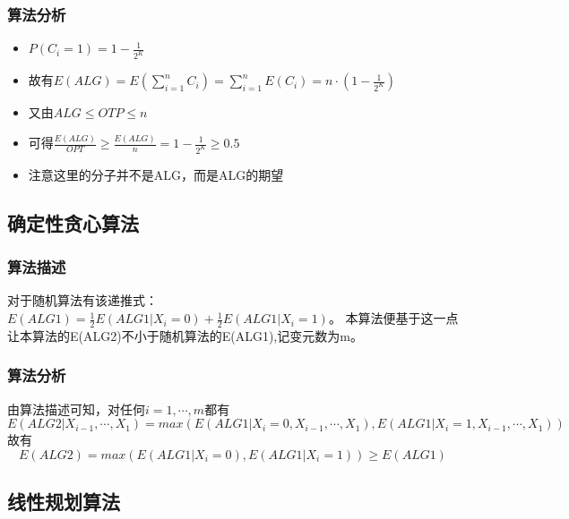 \subsubsection{算法分析}
\begin{itemize}
	\item $P(C_i=1)=1-\frac{1}{2^K} $
	\item 故有$E(ALG)=E(\sum\limits_{i=1}^n C_i)=\sum\limits_{i=1}^n E(C_i)=n\cdot (1-\frac{1}{2^K})$
	\item 又由$ALG\leqslant OTP\leqslant n$
	\item 可得$\frac{E(ALG)}{OPT}\geqslant \frac{E(ALG)}{n}=1-\frac{1}{2^K}\geqslant 0.5$
	\item 注意这里的分子并不是ALG，而是ALG的期望
\end{itemize}

\subsection{确定性贪心算法}

\subsubsection{算法描述}

对于随机算法有该递推式：$E(ALG1)=\frac{1}{2}E(ALG1|X_i=0)+\frac{1}{2}E(ALG1|X_i=1)$。
本算法便基于这一点让本算法的E(ALG2)不小于随机算法的E(ALG1),记变元数为m。

\begin{algorithm}
\end{algorithm}

\subsubsection{算法分析}
由算法描述可知，对任何$i=1,\cdots,m$都有
\begin{displaymath}
	E(ALG2|X_{i-1},\cdots,X_1)=max(E(ALG1|X_i=0,X_{i-1},\cdots,X_1),E(ALG1|X_i=1,X_{i-1},\cdots,X_1))	
\end{displaymath}
故有
\begin{displaymath}
E(ALG2)=max(E(ALG1|X_i=0),E(ALG1|X_i=1))\geqslant E(ALG1)
\end{displaymath}

\subsection{线性规划算法}


